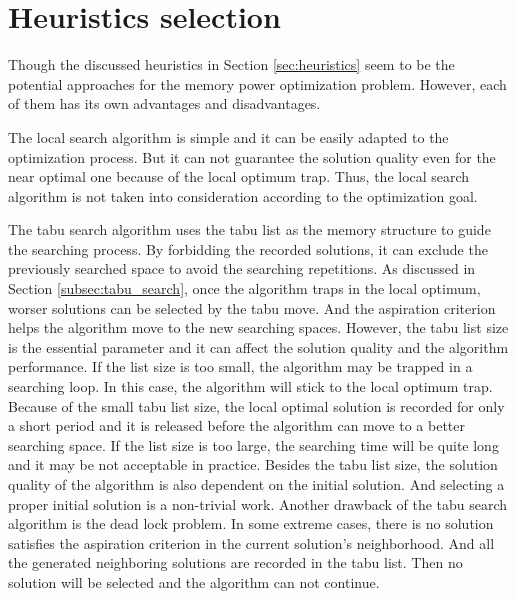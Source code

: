 	\section{Heuristics selection}
	\label{sec:heuristics_selection}
	Though the discussed heuristics in Section \ref{sec:heuristics} seem to
	be the potential approaches for the memory power optimization problem.
	However, each of them has its own advantages and disadvantages.
	
	The local search algorithm is simple and it can be easily adapted to the
	optimization process. But it can not guarantee the solution quality
	even for the near optimal one because of the local optimum trap. Thus,
	the local search algorithm is not taken into consideration according
	to the optimization goal.
	
	The tabu search algorithm uses the tabu list as the memory structure to
	guide the searching process. By forbidding the recorded solutions, it can
	exclude the previously searched space to avoid the searching repetitions.
	As discussed in Section \ref{subsec:tabu_search}, once the algorithm
	traps in the local optimum, worser solutions can be selected by the
	tabu move. And the aspiration criterion helps the algorithm move to the new
	searching spaces.
	However, the tabu list size is the essential parameter
	and it can affect the solution quality and the algorithm performance.
	If the list size is too small, the algorithm may be trapped in a searching loop.
	In this case, the algorithm will stick to the local optimum trap.
	Because of the small tabu list size, the local optimal solution is recorded for 
	only a short period and it is released before the algorithm can move to a better
	searching space. If the list size is too large, the searching time will
	be quite long and it may be not acceptable in practice. Besides the tabu
	list size, the solution quality of the algorithm is also dependent on the
	initial solution. And selecting a proper initial solution is a non-trivial work.	
	Another drawback of the tabu search algorithm is the dead lock problem.
	In some extreme cases, there is no solution satisfies the aspiration
	criterion in the current solution's neighborhood. And all the generated
	neighboring solutions are recorded in the tabu list. Then no solution
	will be selected and the algorithm can not continue.
	
